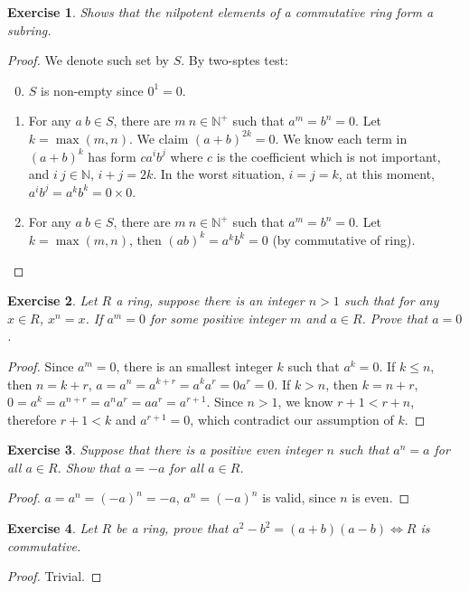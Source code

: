 \documentclass[14pt]{extarticle}
\newtheorem{exercise}{Exercise}[section]
\newcommand{\1}{\{e\}}
\newcommand{\N}{\mathbb{N}}
\begin{document}
\setcounter{exercise}{30}
\begin{exercise}
  Shows that the nilpotent elements of a commutative ring form a subring.
\end{exercise}
\begin{proof}
  We denote such set by $S$.
  By two-sptes test:
  \begin{enumerate}
    \setcounter{enumi}{-1}
    \item $S$ is non-empty since $0^1 = 0$.
    \item For any $a \ b \in S$, there are $m \ n \in \N^+$ such that $a^m = b^n = 0$.
          Let $k = \max(m, n)$. We claim $(a + b)^{2k} = 0$.
          We know each term in $(a + b)^k$ has form $c a^i b^j$ 
          where $c$ is the coefficient which is not important,
          and $i \ j \in \N$, $i + j = 2k$. In the worst situation, $i = j = k$,
          at this moment, $a^ib^j = a^kb^k = 0 \times 0$.
    \item For any $a \ b \in S$, there are $m \ n \in \N^+$ such that $a^m = b^n = 0$.
          Let $k = \max(m, n)$, then $(ab)^k = a^kb^k = 0$ (by commutative of ring).
  \end{enumerate}
\end{proof}

\begin{exercise}
  Let $R$ a ring, suppose there is an integer $n > 1$ such that for any $x \in R$,
  $x^n = x$. If $a^m = 0$ for some positive integer $m$ and $a \in R$. 
  Prove that $a = 0$.
\end{exercise}
\begin{proof}
  Since $a^m = 0$, there is an smallest integer $k$ such that $a^k = 0$.
  If $k \leq n$, then $n = k + r$, $a = a^n = a^{k + r} = a^ka^r = 0a^r = 0$.
  If $k > n$, then $k = n + r$, $0 = a^k = a^{n + r} = a^na^r = aa^r = a^{r + 1}$.
  Since $n > 1$, we know $r + 1 < r + n$, therefore $r + 1 < k$ and $a^{r + 1} = 0$,
  which contradict our assumption of $k$.
\end{proof}

\setcounter{exercise}{49}
\begin{exercise}
  Suppose that there is a positive even integer $n$ such that $a^n = a$ for all $a \in R$.
  Show that $a = - a$ for all $a \in R$.
\end{exercise}
\begin{proof}
  $a = a^n = (-a)^n = -a$, $a^n = (-a)^n$ is valid, since $n$ is even.
\end{proof}

\setcounter{exercise}{54}
\begin{exercise}
  \label{exercise:12.55}
  Let $R$ be a ring, prove that $a^2 - b^2 = (a + b)(a - b) \iff R$ is commutative.
\end{exercise}
\begin{proof}
  Trivial.
\end{proof}
\end{document}
